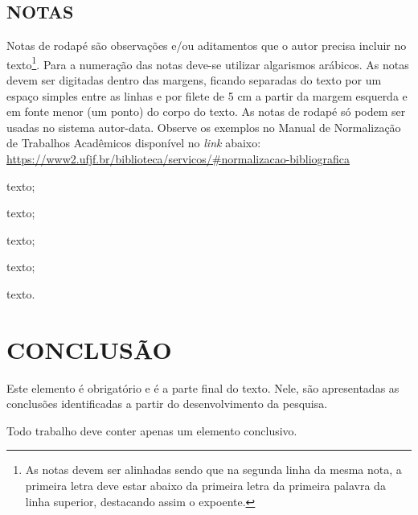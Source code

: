 \documentclass[
  oneside, %
  english,
  brazil
]{abntbibufjf}
\begin{document}
\section{NOTAS}

Notas de rodapé são observações e/ou aditamentos que o autor precisa incluir no texto\footnote[2]{
  As notas devem ser alinhadas sendo que na segunda linha da mesma nota, a primeira letra deve estar abaixo da primeira letra da primeira palavra da linha superior, destacando assim o expoente.
}.
Para a numeração das notas deve-se utilizar algarismos arábicos.
As notas devem ser digitadas dentro das margens, ficando separadas do texto por um espaço simples entre as linhas e por filete de 5 cm a partir da margem esquerda e em fonte menor (um ponto) do corpo do texto.
As notas de rodapé só podem ser usadas no sistema autor-data.
Observe os exemplos no Manual de Normalização de Trabalhos Acadêmicos disponível no \textit{link} abaixo:\\
\url{https://www2.ufjf.br/biblioteca/servicos/#normalizacao-bibliografica}


\begin{alineas}
  \item texto;
  \item texto;
  \begin{subalineas}
    \item texto;
    \item texto;
  \end{subalineas}
  \item texto.
\end{alineas}



\chapter{CONCLUSÃO}

Este elemento é obrigatório e é a parte final do texto.
Nele, são apresentadas as conclusões identificadas a partir do desenvolvimento da pesquisa.

Todo trabalho deve conter apenas um elemento conclusivo.



\end{document}
